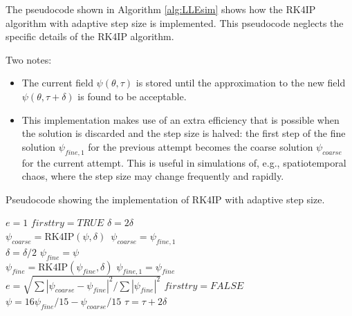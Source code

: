 The pseudocode shown in Algorithm \ref{alg:LLEsim} shows how the RK4IP algorithm with adaptive step size is implemented. This pseudocode neglects the specific details of the RK4IP algorithm. 

Two notes:
\begin{itemize}
	\item The current field $\psi(\theta,\tau)$ is stored until the approximation to the new field $\psi(\theta,\tau+\delta)$ is found to be acceptable. 
	\item This implementation makes use of an extra efficiency that is possible when the solution is discarded and the step size is halved: the first step of the fine solution $\psi_{fine,1}$ for the previous attempt becomes the coarse solution $\psi_{coarse}$ for the current attempt. This is useful in simulations of, e.g., spatiotemporal chaos, where the step size may change frequently and rapidly.
\end{itemize}

{\selectfont 

\begin{algorithm}[h!]\caption{Pseudocode showing the implementation of RK4IP with adaptive step size.} \label{alg:LLEsim}
	\footnotesize{
	\begin{algorithmic}
		

		
		
		
		\Procedure{}{}
		
		\State $e=1$ 
		\State $firsttry=TRUE$ 
		\State $\delta=2\delta$ \\
		
		 \State $\psi_{coarse}=\mathrm{RK4IP}(\psi,\delta)$
		\Else \State $\,\psi_{coarse}=\psi_{fine,1}$ 
		\EndIf\\
		\State$\delta=\delta/2$
		\State$\psi_{fine}=\psi$\\
		\State $\psi_{fine}=\mathrm{RK4IP}(\psi_{fine},\delta)$
		\State $\psi_{fine,1}=\psi_{fine}$
		\EndIf
		\EndFor\\
		\State $e=\sqrt{\sum{|\psi_{coarse}-\psi_{fine}|^2}/\sum{|\psi_{fine}|^2}}$
		\State $firsttry=FALSE$
		\EndWhile\\
		
		
		\State $\psi=16\psi_{fine}/15-\psi_{coarse}/15$
		\State $\tau=\tau+2\delta$  \\
		 
		\EndIf
		 
		\EndIf
		\EndWhile
	\EndProcedure
	\end{algorithmic}
}
\end{algorithm}
}

